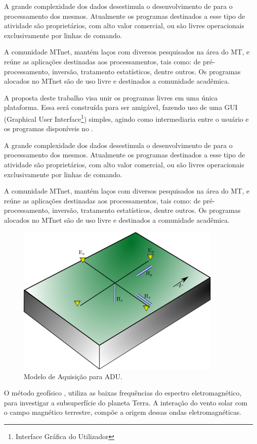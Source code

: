 \documentclass[12pt,twoside,oneright,a4paper,chapter=TITLE,english,brazil]{unipampa}
\begin{document}
    A grande complexidade dos dados desestimula o desenvolvimento de para o processamento dos mesmos. Atualmente os programas destinados a esse tipo de atividade são proprietários,\cite{cagniard1953basic} com alto valor comercial, ou são livres operacionais exclusivamente por linhas de comando.  
    
    A comunidade MTnet, mantém laços com diversos pesquisados na área do MT, e reúne as aplicações destinadas aos processamentos, tais como:  de pré-processamento, inversão, tratamento estatísticos, dentre outros. Os programas alocados no MTnet são de uso livre e destinados a comunidade acadêmica.
    
    
    
    
    A proposta deste trabalho visa unir os programas livres em uma única plataforma. Essa será  construída para ser amigável, fazendo uso de uma GUI ({Graphical User Interface}\footnote{Interface Gráfica do Utilizador}) simples, agindo como intermediaria entre o usuário e os programas disponíveis no .
    
     A grande complexidade dos dados desestimula o desenvolvimento de para o processamento dos mesmos. Atualmente os programas destinados a esse tipo de atividade são proprietários, com alto valor comercial, ou são livres operacionais exclusivamente por linhas de comando.  
    
    A comunidade MTnet, mantém laços com diversos pesquisados na área do MT, e reúne as aplicações destinadas aos processamentos, tais como:  de pré-processamento, inversão, tratamento estatísticos, dentre outros. Os programas alocados no MTnet são de uso livre e destinados a comunidade acadêmica.
    
    \begin{figure}[H]
        \caption{Modelo de Aquisição para ADU.}
        \begin{center}
         \includegraphics[width=10cm]{fig/ADU_MODELO.png}
        \end{center}
        \legend{\Fonte{\oautor}}
    \end{figure}
     O método geofísico , utiliza as baixas frequências do espectro eletromagnético, para investigar a subsuperfície do planeta Terra. A interação do vento solar com o campo magnético terrestre, compõe a origem dessas ondas eletromagnéticas.
     
\end{document}
